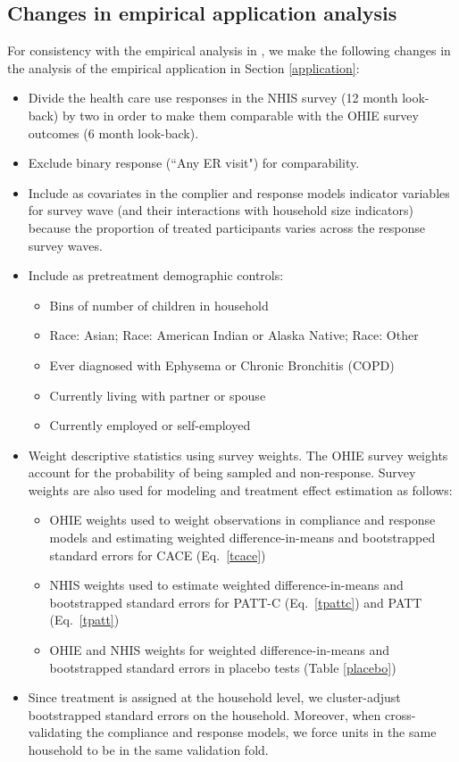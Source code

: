 \documentclass[hidelinks,12pt,letterpaper]{article}
\begin{document}
\subsection{Changes in empirical application analysis}

For consistency with the empirical analysis in \citet{finkelstein2012}, we make the following changes in the analysis of the empirical application in Section \ref{application}:

\begin{itemize}
	\item Divide the health care use responses in the NHIS survey (12 month look-back) by two in order to make them comparable with the OHIE survey outcomes (6 month look-back). 
	\item Exclude binary response (``Any ER visit") for comparability. 
	\item Include as covariates in the complier and response models indicator variables for survey wave (and their interactions with household size indicators) because the proportion of treated participants varies across the response survey waves.
	\item Include as pretreatment demographic controls:
	\begin{itemize}
		\item Bins of number of children in household
		\item Race: Asian; Race: American Indian or Alaska Native; Race: Other
		\item Ever diagnosed with Ephysema or Chronic Bronchitis (COPD)
		\item Currently living with partner or spouse
		\item Currently employed or self-employed
	\end{itemize}
	\item Weight descriptive statistics using survey weights. The OHIE survey weights account for the probability of being sampled and non-response. Survey weights are also used for modeling and treatment effect estimation as follows:
		\begin{itemize}
		\item OHIE weights used to weight observations in compliance and response models and estimating weighted difference-in-means and bootstrapped standard errors for CACE (Eq.~\eqref{tcace})
		\item NHIS weights used to estimate weighted difference-in-means and bootstrapped standard errors for PATT-C (Eq.~\eqref{tpattc}) and PATT (Eq.~\eqref{tpatt})
		\item OHIE and NHIS weights for weighted difference-in-means and bootstrapped standard errors in placebo tests (Table \ref{placebo})
	\end{itemize}
	\item Since treatment is assigned at the household level, we cluster-adjust bootstrapped standard errors on the household. Moreover, when cross-validating the compliance and response models, we force units in the same household to be in the same validation fold. 
	
\end{itemize}

\clearpage
\printbibliography
\end{document}
